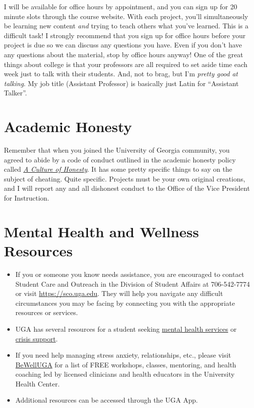 \documentclass[11pt, letterpaper]{article}
\begin{document}
I will be available for office hours by appointment, and you can sign up for 20 minute slots through the course website. With each project, you'll simultaneously be learning new content \textit{and} trying to teach others what you've learned. This is a difficult task! I strongly recommend that you sign up for office hours before your project is due so we can discuss any questions you have. Even if you don't have any questions about the material, stop by office hours anyway! One of the great things about college is that your professors are all required to set aside time each week just to talk with their students. And, not to brag, but I'm \textit{pretty good at talking}. My job title (Assistant Professor) is basically just Latin for ``Assistant Talker''.




\section*{Academic Honesty}

Remember that when you joined the University of Georgia community, you agreed to abide by a code of conduct outlined in the academic honesty policy called \href{https://honesty.uga.edu/Academic-Honesty-Policy/Introduction/}{\textit{A Culture of Honesty}}. It has some pretty specific things to say on the subject of cheating. Quite specific. Projects must be your own original creations, and I will report any and all dishonest conduct to the Office of the Vice President for Instruction.

\section*{Mental Health and Wellness Resources}

\begin{itemize}
\item If you or someone you know needs assistance, you are encouraged to contact Student Care and Outreach in the Division of Student Affairs at 706-542-7774 or visit \href{https://sco.uga.edu}{https://sco.uga.edu}. They will help you navigate any difficult circumstances you may be facing by connecting you with the appropriate resources or services. 
\item UGA has several resources for a student seeking \href{https://www.uhs.uga.edu/bewelluga/bewelluga}{mental health services} or \href{https://www.uhs.uga.edu/info/emergencies}{crisis support}. 
\item If you need help managing stress anxiety, relationships, etc., please visit \href{https://www.uhs.uga.edu/bewelluga/bewelluga}{BeWellUGA} for a list of FREE workshops, classes, mentoring, and health coaching led by licensed clinicians and health educators in the University Health Center.
\item Additional resources can be accessed through the UGA App.
\end{itemize}



\end{document}
